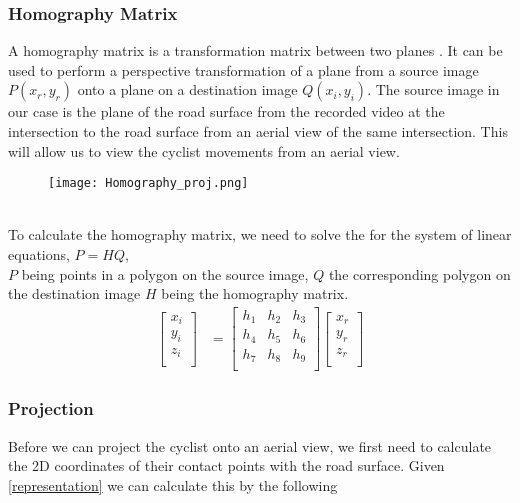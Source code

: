 \subsubsection{Homography Matrix}

A homography matrix is a transformation matrix between two planes \cite{hartley_zisserman_2004}. It can be used to perform a perspective transformation of a plane from a source image $P(x_r, y_r)$ onto a plane on a destination image $Q(x_i, y_i)$.
The source image in our case is the plane of the road surface from the recorded video at the intersection to the road surface from an aerial view of the same intersection.  
This will allow us to view the cyclist movements from an aerial view.
\ \\ 
\begin{figure}[h]
  \texttt{[image: Homography\_proj.png]}
  \centering 
  \end{figure}
  \label{homography}
\ \\ 
To calculate the homography matrix, we need to solve the for the system of linear equations, $P = HQ$,
\ \\
$P$ being points in a polygon on the source image, $Q$ the corresponding polygon on the destination image $H$ being the homography matrix.
\begin{align}
\label{eq:3}
  \begin{bmatrix}
    x_{i} \\
    y_{i} \\
    z_{i} \\
  \end{bmatrix}
  &= \begin{bmatrix}
      h_1 & h_2 & h_3 \\
      h_4 & h_5 & h_6 \\
      h_7 & h_8 & h_9 \\
  \end{bmatrix}
  \begin{bmatrix}
    x_{r} \\
    y_{r} \\
    z_{r} \\
  \end{bmatrix}
\end{align}

\subsubsection{Projection}

Before we can project the cyclist onto an aerial view, we first need to calculate the 2D coordinates of their contact points with the road surface.
Given \ref{representation} we can calculate this by the following


